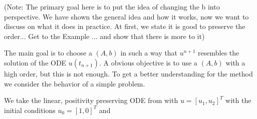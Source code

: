 \documentclass[a4paper]{scrartcl}
\numberwithin{equation}{section}
\theoremstyle{plain}
\theoremstyle{definition}
\numberwithin{theorem}{section}
\newcommand{\1}{\mathbbm{1}}
\begin{document}
(Note: The primary goal here is to put the idea of changing the b into perspective. We have shown the general idea and how it works, now we want to discuss on what it does in practice. At first, we state it is good to preserve the order... Get to the Example ... and show that there is more to it)


The main goal is to choose a $(A,b)$ in such a way that $u^{n+1}$ resembles the solution of the ODE $u(t_{n+1})$. 
A obvious objective is to use a $(A,b)$ with a high order, but this is not enough.
To get a better understanding for the method we consider the behavior of a simple problem.   

We take the linear, positivity preserving ODE from \cite{kopecz_unconditionally_2018} with $u = [u_1,u_2]^T$ with the initial conditions $u_0 = [1,0]^T$ and
\end{document}
